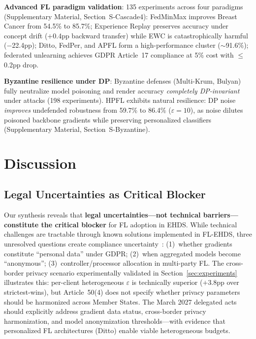 \documentclass[conference]{IEEEtran}
\begin{document}
\textbf{Advanced FL paradigm validation}: 135 experiments across four paradigms (Supplementary Material, Section~S-Cascade4): FedMinMax improves Breast Cancer from 54.5\% to 85.7\%; Experience Replay preserves accuracy under concept drift ($+$0.4pp backward transfer) while EWC is catastrophically harmful ($-$22.4pp); Ditto, FedPer, and APFL form a high-performance cluster ($\sim$91.6\%); federated unlearning achieves GDPR Article~17 compliance at 5\% cost with $\leq$0.2pp drop.

\textbf{Byzantine resilience under DP}: Byzantine defenses (Multi-Krum, Bulyan) fully neutralize model poisoning and render accuracy \textit{completely DP-invariant} under attacks (198 experiments). HPFL exhibits natural resilience: DP noise \textit{improves} undefended robustness from 59.7\% to 86.4\% ($\varepsilon{=}10$), as noise dilutes poisoned backbone gradients while preserving personalized classifiers (Supplementary Material, Section~S-Byzantine).

\section{Discussion}
\label{sec:discussion}

\subsection{Legal Uncertainties as Critical Blocker}

Our synthesis reveals that \textbf{legal uncertainties---not technical barriers---constitute the critical blocker} for FL adoption in EHDS. While technical challenges are tractable through known solutions implemented in FL-EHDS, three unresolved questions create compliance uncertainty~\cite{quinn2024gdpr}: (1)~whether gradients constitute ``personal data'' under GDPR; (2)~when aggregated models become ``anonymous''; (3)~controller/processor allocation in multi-party FL. The cross-border privacy scenario experimentally validated in Section~\ref{sec:experiments} illustrates this: per-client heterogeneous $\varepsilon$ is technically superior ($+$3.8pp over strictest-wins), but Article~50(4) does not specify whether privacy parameters should be harmonized across Member States. The March 2027 delegated acts should explicitly address gradient data status, cross-border privacy harmonization, and model anonymization thresholds---with evidence that personalized FL architectures (Ditto) enable viable heterogeneous budgets.
\end{document}
